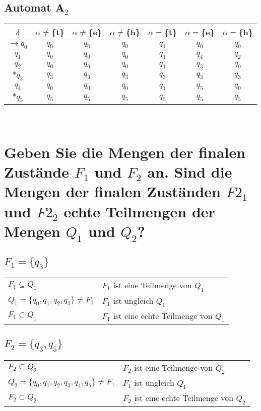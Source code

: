 \documentclass[11pt]{article} %
\begin{document}
\subsection{Automat A$_{2}$}
\begin{tabular}{c|c|c|c|c|c|c}
 $\delta$ & $\alpha \neq $\{t\}&  $\alpha \neq $\{e\}  &  $\alpha \neq $\{h\} & $\alpha = $\{t\}&  $\alpha = $\{e\}  &  $\alpha = $\{h\}\\
\hline
$\rightarrow q_{0}$ & $q_{0}$  & $q_{0}$ & $q_{0}$ & $q_{1}$ & $q_{0}$ & $q_{0}$ \\
\hline
$q_{1}$ & $q_{0}$  &  $q_{0}$ &  $q_{0}$ &  $q_{1}$ &  $q_{4}$ &  $q_{2}$ \\
\hline
$q_{2}$ &  $q_{0}$  &  $q_{0}$ &  $q_{0}$ &  $q_{1}$ &  $q_{3}$ &  $q_{0}$ \\
\hline
$\ast q_{3}$ &  $q_{3}$  &  $q_{3}$ &  $q_{3}$ &  $q_{3}$ &  $q_{3}$ &  $q_{3}$ \\
\hline
$q_{4}$ &  $q_{0}$  &  $q_{0}$ &  $q_{0}$ &  $q_{1}$ &  $q_{5}$ &  $q_{0}$ \\
\hline
$\ast q_{5}$ &  $q_{5}$  &  $q_{5}$ &  $q_{5}$ &  $q_{5}$ &  $q_{5}$ &  $q_{5}$ \\
 \hline
 \end{tabular}\\
\section{Geben Sie die Mengen der finalen Zustände $F_{1}$ und $F_{2}$ an. Sind die Mengen der
finalen Zuständen $F2_{1}$ und $F2_{2}$ echte Teilmengen der Mengen $Q_{1}$ und $Q_{2}$?}
\subsection{$F_{1}=\{q_{3}\}$}
\begin{tabular}{ll}
$F_{1}\subseteq Q_{1}$ & $F_{1}$ ist eine Teilmenge von $Q_{1}$\\
$Q_{1}=\{q_{0},q_{1},q_{2},q_{3}\} \neq F_{1}$ & $F_{1}$ ist ungleich $Q_{1}$\\
\hline
$F_{1}\subset Q_{1}$ & $F_{1}$ ist eine echte Teilmenge von $Q_{1}$
\end{tabular}
\subsection{$F_{2}=\{q_{3},q_{5}\}$}
\begin{tabular}{ll}
$F_{2}\subseteq Q_{2}$ & $F_{2}$ ist eine Teilmenge von $Q_{2}$\\
$Q_{2}=\{q_{0},q_{1},q_{2},q_{3},q_{4},q_{5}\} \neq F_{1}$ & $F_{1}$ ist ungleich $Q_{1}$\\
\hline
$F_{2}\subset Q_{2}$ & $F_{2}$ ist eine echte Teilmenge von $Q_{2}$
\end{tabular}
\end{document}
